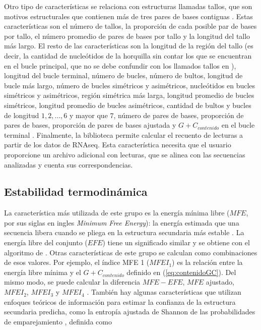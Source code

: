 Otro tipo de características se relaciona con estructuras llamadas tallos, que son motivos estructurales que contienen más de tres pares de bases contiguas
\citep{ng2007novo}. Estas características son el número de tallos, la proporción de cada posible par de bases por tallo, el número promedio de pares de bases
por tallo y la longitud del tallo más largo. El resto de las características son la longitud de la región del tallo (es decir, la cantidad de nucleótidos de la
horquilla sin contar los que se encuentran en el bucle principal, que no se debe confundir con los llamados tallos en \cite{ng2007novo}), longitud del bucle
terminal, número de bucles, número de bultos, longitud de bucle más largo, número de bucles simétricos y asimétricos, nucleótidos en bucles simétricos y
asimétricos, región simétrica más larga, longitud promedio de bucles simétricos, longitud promedio de bucles asimétricos, cantidad de bultos y bucles de
longitud $ 1,2, ..., 6$ y mayor que $7$, número de pares de bases, proporción de pares de bases, proporción de pares de bases ajustada y $G+C_{contenido}$ en el
bucle terminal \citep{Lopes2014}. Finalmente, la biblioteca permite calcular el recuento de lecturas a partir de los datos de RNAseq. Esta característica
necesita que el usuario proporcione un archivo adicional con lecturas, que se alinea con las secuencias analizadas y cuenta sus correspondencias.

\subsection{Estabilidad termodinámica}

La característica más utilizada de este grupo es la energía mínima libre ($MFE$, por sus siglas en ingles \textit{Minimum Free Energy}): la energía estimada que
una secuencia libera cuando se pliega en la estructura secundaria más estable \citep{zuker1981optimal}. La energía libre del conjunto ($EFE$) tiene un
significado similar y se obtiene con el algoritmo de \cite{mccaskill1990}. Otras características de este grupo se calculan como combinaciones de esos valores.
Por ejemplo, el índice MFE 1 ($MFEI_{1}$) es la relación entre la energía libre mínima y el ${G+C}_{contenido}$ definido en (\ref{eq:contenidoGC}). Del mismo
modo, se puede calcular la diferencia $MFE-EFE$, $MFE$ ajustado, $MFEI_{2}$, $MFEI_{3}$ y $MFEI_{4}$ \citep{batuwita2009micropred}. También hay algunas
características que utilizan enfoques teóricos de información para estimar la confianza de la estructura secundaria predicha, como la entropía ajustada de
Shannon de las probabilidades de emparejamiento \citep{ng2007novo}, definida como

